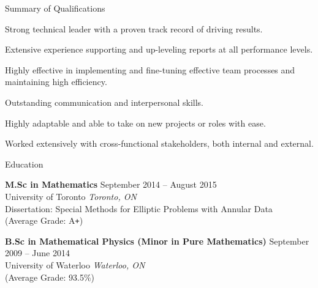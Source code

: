\documentclass{resume} %
\begin{document}

\begin{rSection}{Summary of Qualifications}

\begin{rSubsection}{}{}{}{}
\item Strong technical leader with a proven track record of driving results.
\item Extensive experience supporting and up-leveling reports at all performance levels.
\item Highly effective in implementing and fine-tuning effective team processes and maintaining high efficiency.
\item Outstanding communication and interpersonal skills.
\item Highly adaptable and able to take on new projects or roles with ease.
\item Worked extensively with cross-functional stakeholders, both internal and external.
\end{rSubsection}

\end{rSection}


\begin{rSection}{Education}

\textbf{M.Sc in Mathematics} \hfill {September 2014 -- August 2015} \\ 
University of Toronto  \hfill {\textit{Toronto, ON}} \\
Dissertation: Special Methods for Elliptic Problems with Annular Data \\
(Average Grade: A\verb!+!)

\textbf{B.Sc in Mathematical Physics (Minor in Pure Mathematics)} \hfill {September 2009 -- June 2014} \\ 
University of Waterloo \hfill {\textit{Waterloo, ON}} \\
(Average Grade: 93.5\%)

\end{rSection}

\end{document}
